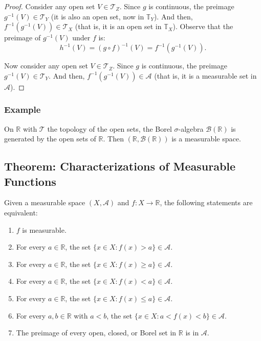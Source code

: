 \documentclass[11pt]{article}
\begin{document}
\begin{proof}
Consider any open set \(V \in \mathcal{T}_Z\). Since \(g\) is continuous, the preimage \(g^{-1}(V) \in \mathcal{T}_Y\) (it is also an open set, now in \(\mathbb{T}_Y\)). And then, \(f^{-1}(g^{-1}(V)) \in \mathcal{T}_X\) (that is, it is an open set in \(\mathbb{T}_X\)).
    Observe that the preimage of \(g^{-1}(V)\) under \(f\) is:
    \[h^{-1}(V) = (g \circ f)^{-1}(V) = f^{-1}(g^{-1}(V)).\]

    Now consider any open set \(V \in \mathcal{T}_Z\). Since \(g\) is continuous, the preimage \(g^{-1}(V) \in \mathcal{T}_Y\). And then, \(f^{-1}(g^{-1}(V)) \in \mathcal{A}\) (that is, it is a measurable set in \(\mathcal{A}\)).
\end{proof}

\subsubsection*{Example}
On \(\mathbb{R}\) with \(\mathcal{T}\) the topology of the open sets, the Borel \(\sigma\)-algebra \(\mathcal{B}(\mathbb{R})\) is generated by the open sets of \(\mathbb{R}\). Then \((\mathbb{R}, \mathcal{B}(\mathbb{R}))\) is a measurable space.

\subsection{Theorem: Characterizations of Measurable Functions}
Given a measurable space \((X, \mathcal{A})\) and \(f : X \to \mathbb{R}\), the following statements are equivalent:
\begin{enumerate}
    \item \(f\) is measurable.
    \item For every \(a \in \mathbb{R}\), the set \(\{x \in X : f(x) > a\} \in \mathcal{A}\).
    \item For every \(a \in \mathbb{R}\), the set \(\{x \in X : f(x) \geq a\} \in \mathcal{A}\).
    \item For every \(a \in \mathbb{R}\), the set \(\{x \in X : f(x) < a\} \in \mathcal{A}\).
    \item For every \(a \in \mathbb{R}\), the set \(\{x \in X : f(x) \leq a\} \in \mathcal{A}\).
    \item For every \(a, b \in \mathbb{R}\) with \(a < b\), the set \(\{x \in X : a < f(x) < b\} \in \mathcal{A}\).
    \item The preimage of every open, closed, or Borel set in \(\mathbb{R}\) is in \(\mathcal{A}\).
\end{enumerate}
\end{document}
